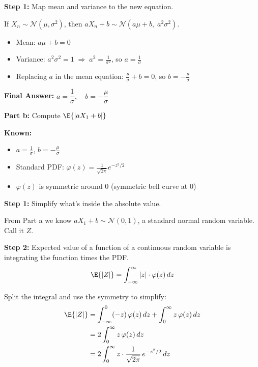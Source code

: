 \documentclass{article}
\begin{document}
\begin{aprob}
    \medskip
    \textbf{Step 1:} Map mean and variance to the new equation.

    If $X_n \sim \mathcal{N}(\mu, \sigma^2)$, then $aX_n + b \sim \mathcal{N}(a\mu + b,\; a^2\sigma^2)$.

    \begin{itemize}
        \item Mean: $a\mu + b = 0$
        \item Variance: $a^2\sigma^2 = 1 \;\Rightarrow\; a^2 = \frac{1}{\sigma^2}$, so $a = \frac{1}{\sigma}$
        \item Replacing $a$ in the mean equation: $\frac{\mu}{\sigma} + b = 0$, so $b = -\frac{\mu}{\sigma}$
    \end{itemize}

    \medskip
    \textbf{Final Answer:} $\boxed{a = \dfrac{1}{\sigma}, \quad b = -\dfrac{\mu}{\sigma}}$

    \bigskip
    \begin{mdframed}
    \textbf{\large Part b:} Compute $\E{|aX_1+b|}$
    \end{mdframed}

    \textbf{Known:}
    \begin{itemize}
        \item $a = \frac{1}{\sigma}$, \; $b = -\frac{\mu}{\sigma}$
        \item Standard PDF: $\varphi(z) = \frac{1}{\sqrt{2\pi}} e^{-z^2/2}$
        \item $\varphi(z)$ is symmetric around 0 (symmetric bell curve at 0)
    \end{itemize}

    \medskip
    \textbf{Step 1:} Simplify what's inside the absolute value.

    From Part a we know $aX_1 + b \sim \mathcal{N}(0, 1)$, a standard normal random variable. Call it $Z$.

    \medskip
    \textbf{Step 2:} Expected value of a function of a continuous random variable is integrating the function times the PDF.
    \[
        \E{|Z|} = \int_{-\infty}^{\infty} |z| \cdot \varphi(z)\, dz
    \]

    Split the integral and use the symmetry to simplify:
    \begin{align*}
        \E{|Z|} &= \int_{-\infty}^{0} (-z)\, \varphi(z)\, dz + \int_{0}^{\infty} z\, \varphi(z)\, dz \\
        &= 2 \int_{0}^{\infty} z\, \varphi(z)\, dz \\
        &= 2 \int_{0}^{\infty} z \cdot \frac{1}{\sqrt{2\pi}}\, e^{-z^2/2}\, dz
    \end{align*}


\end{aprob}
\end{document}
